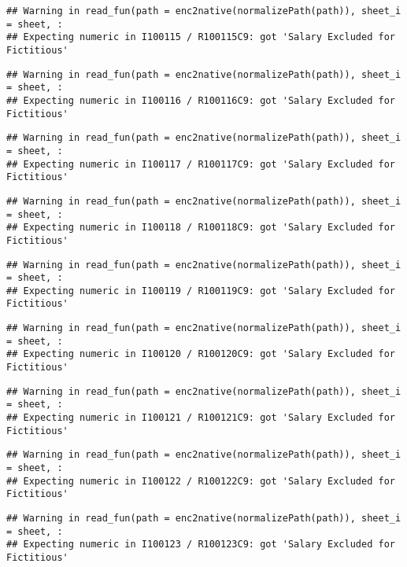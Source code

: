 \documentclass[
]{article}
\begin{document}
\begin{verbatim}
## Warning in read_fun(path = enc2native(normalizePath(path)), sheet_i = sheet, :
## Expecting numeric in I100115 / R100115C9: got 'Salary Excluded for Fictitious'
\end{verbatim}

\begin{verbatim}
## Warning in read_fun(path = enc2native(normalizePath(path)), sheet_i = sheet, :
## Expecting numeric in I100116 / R100116C9: got 'Salary Excluded for Fictitious'
\end{verbatim}

\begin{verbatim}
## Warning in read_fun(path = enc2native(normalizePath(path)), sheet_i = sheet, :
## Expecting numeric in I100117 / R100117C9: got 'Salary Excluded for Fictitious'
\end{verbatim}

\begin{verbatim}
## Warning in read_fun(path = enc2native(normalizePath(path)), sheet_i = sheet, :
## Expecting numeric in I100118 / R100118C9: got 'Salary Excluded for Fictitious'
\end{verbatim}

\begin{verbatim}
## Warning in read_fun(path = enc2native(normalizePath(path)), sheet_i = sheet, :
## Expecting numeric in I100119 / R100119C9: got 'Salary Excluded for Fictitious'
\end{verbatim}

\begin{verbatim}
## Warning in read_fun(path = enc2native(normalizePath(path)), sheet_i = sheet, :
## Expecting numeric in I100120 / R100120C9: got 'Salary Excluded for Fictitious'
\end{verbatim}

\begin{verbatim}
## Warning in read_fun(path = enc2native(normalizePath(path)), sheet_i = sheet, :
## Expecting numeric in I100121 / R100121C9: got 'Salary Excluded for Fictitious'
\end{verbatim}

\begin{verbatim}
## Warning in read_fun(path = enc2native(normalizePath(path)), sheet_i = sheet, :
## Expecting numeric in I100122 / R100122C9: got 'Salary Excluded for Fictitious'
\end{verbatim}

\begin{verbatim}
## Warning in read_fun(path = enc2native(normalizePath(path)), sheet_i = sheet, :
## Expecting numeric in I100123 / R100123C9: got 'Salary Excluded for Fictitious'
\end{verbatim}
\end{document}
